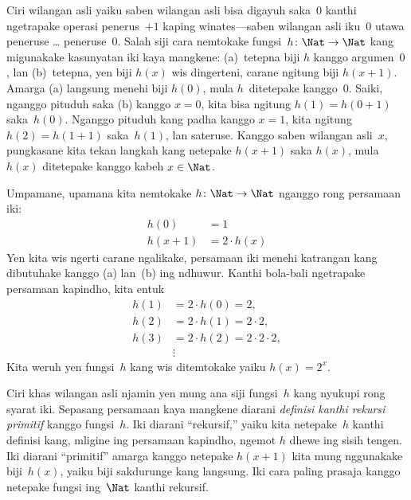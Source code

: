 \documentclass[../../../include/open-logic-section]{subfiles}
\begin{document}

Ciri wilangan asli yaiku saben wilangan asli bisa digayuh saka~$0$
kanthi ngetrapake operasi penerus~$+1$ kaping winates---saben
wilangan asli iku~$0$ utawa peneruse \dots{} peneruse~$0$.
Salah siji cara nemtokake fungsi~$h\colon\Nat \to \Nat$
kang migunakake kasunyatan iki kaya mangkene: (a)~tetepna
biji $h$ kanggo argumen~$0$, lan (b)~tetepna, yen biji
$h(x)$ wis dingerteni, carane ngitung biji $h(x+1)$.
Amarga (a)
langsung menehi biji $h(0)$, mula $h$~ditetepake kanggo~$0$.
Saiki, nganggo pituduh saka (b) kanggo $x=0$, kita bisa ngitung
$h(1) = h(0+1)$ saka~$h(0)$. Nganggo pituduh kang padha kanggo
$x=1$, kita ngitung $h(2) = h(1+1)$ saka~$h(1)$, lan sateruse.
%
%
Kanggo saben wilangan asli~$x$, pungkasane kita tekan langkah
kang netepake $h(x+1)$ saka $h(x)$, mula $h(x)$ ditetepake
kanggo kabeh $x \in \Nat$.

Umpamane, upamana kita nemtokake $h\colon \Nat \to \Nat$
nganggo rong persamaan iki:
\begin{align*}
h(0) & =  1\\
h(x+1) & =  2 \cdot h(x)
\end{align*}
Yen kita wis ngerti carane ngalikake, persamaan iki menehi
katrangan kang dibutuhake kanggo (a) lan~(b) ing ndhuwur.
Kanthi bola-bali ngetrapake persamaan kapindho, kita entuk
\begin{align*}
  h(1) & = 2\cdot h(0) = 2,\\
  h(2) & = 2\cdot h(1) = 2\cdot 2,\\
  h(3) & = 2 \cdot h(2) = 2\cdot 2 \cdot 2,\\
  & \vdots
\end{align*}
Kita weruh yen fungsi~$h$ kang wis ditemtokake yaiku $h(x) = 2^x$.

Ciri khas wilangan asli njamin yen mung ana siji fungsi~$h$
kang nyukupi rong syarat iki. Sepasang persamaan kaya mangkene
diarani \emph{definisi kanthi rekursi primitif} kanggo
fungsi~$h$. Iki diarani “rekursif,” yaiku kita netepake~$h$
kanthi definisi kang, mligine ing persamaan kapindho,
ngemot $h$ dhewe ing sisih tengen. Iki diarani “primitif”
amarga kanggo netepake $h(x+1)$ kita mung nggunakake
biji~$h(x)$, yaiku biji sakdurunge kang langsung.
Iki cara paling prasaja kanggo netepake fungsi ing~$\Nat$
kanthi rekursif.
\end{document}
